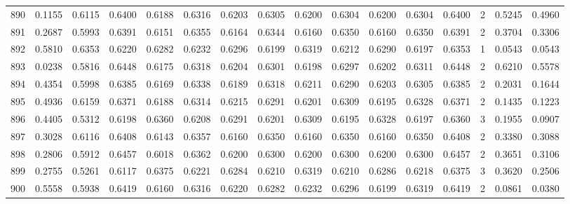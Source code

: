 \begin{tabular}{lrrrrrrrrrrrrrrr}
890 &      0.1155 &  0.6115 &  0.6400 &  0.6188 &  0.6316 &  0.6203 &  0.6305 &  0.6200 &  0.6304 &  0.6200 &   0.6304 &     0.6400 &      2 &                    0.5245 &                     0.4960 \\
891 &      0.2687 &  0.5993 &  0.6391 &  0.6151 &  0.6355 &  0.6164 &  0.6344 &  0.6160 &  0.6350 &  0.6160 &   0.6350 &     0.6391 &      2 &                    0.3704 &                     0.3306 \\
892 &      0.5810 &  0.6353 &  0.6220 &  0.6282 &  0.6232 &  0.6296 &  0.6199 &  0.6319 &  0.6212 &  0.6290 &   0.6197 &     0.6353 &      1 &                    0.0543 &                     0.0543 \\
893 &      0.0238 &  0.5816 &  0.6448 &  0.6175 &  0.6318 &  0.6204 &  0.6301 &  0.6198 &  0.6297 &  0.6202 &   0.6311 &     0.6448 &      2 &                    0.6210 &                     0.5578 \\
894 &      0.4354 &  0.5998 &  0.6385 &  0.6169 &  0.6338 &  0.6189 &  0.6318 &  0.6211 &  0.6290 &  0.6203 &   0.6305 &     0.6385 &      2 &                    0.2031 &                     0.1644 \\
895 &      0.4936 &  0.6159 &  0.6371 &  0.6188 &  0.6314 &  0.6215 &  0.6291 &  0.6201 &  0.6309 &  0.6195 &   0.6328 &     0.6371 &      2 &                    0.1435 &                     0.1223 \\
896 &      0.4405 &  0.5312 &  0.6198 &  0.6360 &  0.6208 &  0.6291 &  0.6201 &  0.6309 &  0.6195 &  0.6328 &   0.6197 &     0.6360 &      3 &                    0.1955 &                     0.0907 \\
897 &      0.3028 &  0.6116 &  0.6408 &  0.6143 &  0.6357 &  0.6160 &  0.6350 &  0.6160 &  0.6350 &  0.6160 &   0.6350 &     0.6408 &      2 &                    0.3380 &                     0.3088 \\
898 &      0.2806 &  0.5912 &  0.6457 &  0.6018 &  0.6362 &  0.6200 &  0.6300 &  0.6200 &  0.6300 &  0.6200 &   0.6300 &     0.6457 &      2 &                    0.3651 &                     0.3106 \\
899 &      0.2755 &  0.5261 &  0.6117 &  0.6375 &  0.6221 &  0.6284 &  0.6210 &  0.6319 &  0.6210 &  0.6286 &   0.6218 &     0.6375 &      3 &                    0.3620 &                     0.2506 \\
900 &      0.5558 &  0.5938 &  0.6419 &  0.6160 &  0.6316 &  0.6220 &  0.6282 &  0.6232 &  0.6296 &  0.6199 &   0.6319 &     0.6419 &      2 &                    0.0861 &                     0.0380 \\

\end{tabular}
